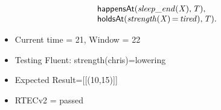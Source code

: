 \documentclass[8pt]{beamer}
\DeclareMathOperator{\val}{=}  %
\def \patsize {}
\def\happensAt{\textsf{\patsize happensAt}}
\def\holdsAt{\textsf{\patsize holdsAt}}
\newenvironment{mysplit}%
  {\arraycolsep 0pt \begin{array}{l}}%
  {\end{array}}
\begin{document}
\begin{frame}
\begin{minipage}{0.55\linewidth}
\begin{align*}
\begin{mysplit}
                \quad    \happensAt\mathit{(sleep\_end(X),T),}\\
                \quad    \holdsAt\mathit{(strength(X)\val tired),T).}\\
            \end{mysplit}
        \end{align*}
    \end{minipage}
    \begin{itemize}
        \item Current time = 21, Window = 22
        \item Testing Fluent: strength(chris)=lowering
        \item Expected Result=[[(10,15)]]
        \item RTECv2 = passed
    \end{itemize}
\end{frame}
\end{document}
